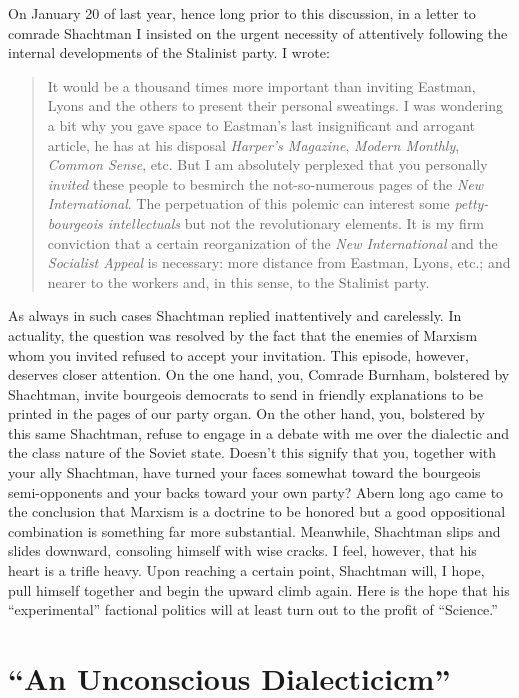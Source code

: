 On January 20 of last year, hence long prior to this discussion, in a letter to comrade Shachtman I insisted on the urgent necessity of attentively following the internal developments of the Stalinist party. I wrote:

\begin{quote}
  It would be a thousand times more important than inviting Eastman, Lyons and the others to present their personal sweatings. I was wondering a bit why you gave space to Eastman’s last insignificant and arrogant article, he has at his disposal \emph{Harper’s Magazine}, \emph{Modern Monthly}, \emph{Common Sense}, etc. But I am absolutely perplexed that you personally \emph{invited} these people to besmirch the not-so-numerous pages of the \emph{New International}. The perpetuation of this polemic can interest some \emph{petty-bourgeois intellectuals} but not the revolutionary elements. It is my firm conviction that a certain reorganization of the \emph{New International} and the \emph{Socialist Appeal} is necessary: more distance from Eastman, Lyons, etc.; and nearer to the workers and, in this sense, to the Stalinist party.
\end{quote}

As always in such cases Shachtman replied inattentively and carelessly. In actuality, the question was resolved by the fact that the enemies of Marxism whom you invited refused to accept your invitation. This episode, however, deserves closer attention. On the one hand, you, Comrade Burnham, bolstered by Shachtman, invite bourgeois democrats to send in friendly explanations to be printed in the pages of our party organ. On the other hand, you, bolstered by this same Shachtman, refuse to engage in a debate with me over the dialectic and the class nature of the Soviet state. Doesn’t this signify that you, together with your ally Shachtman, have turned your faces somewhat toward the bourgeois semi-opponents and your backs toward your own party? Abern long ago came to the conclusion that Marxism is a doctrine to be honored but a good oppositional combination is something far more substantial. Meanwhile, Shachtman slips and slides downward, consoling himself with wise cracks. I feel, however, that his heart is a trifle heavy. Upon reaching a certain point, Shachtman will, I hope, pull himself together and begin the upward climb again. Here is the hope that his “experimental” factional politics will at least turn out to the profit of “Science.”

\section*{“An Unconscious Dialecticicm”}

